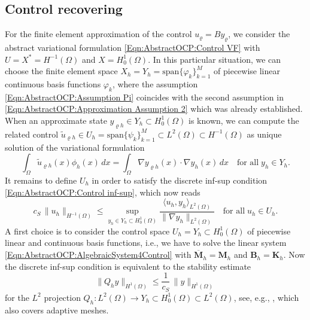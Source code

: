 \documentclass{article}
\numberwithin{equation}{section}
\begin{document}
\subsection{Control recovering}
%
\label{Subsection:Application:EnergyRegularisation:ControlRecovering}
For the finite element approximation of the control $u_\varrho = B y_\varrho$,
we consider the abstract variational
formulation \eqref{Eqn:AbstractOCP:Control VF} with
$U= X^* =H^{-1}(\Omega)$ and $X = H^1_0(\Omega)$. 
In this particular situation, we can choose the finite element space
$X_h = Y_h = \mbox{span} \{ \varphi_k \}_{k=1}^M$
of piecewise linear continuous basis functions $\varphi_k$,
where the assumption \eqref{Eqn:AbstractOCP:Assumption Pi}
coincides with the second assumption
in \eqref{Eqn:AbstractOCP:Approximation Assumption 2} which was
already established.
When an approximate state $y_{\varrho h} \in Y_h \subset H^1_0(\Omega)$
is known, we can compute the related control
$\widetilde{u}_{\varrho h} \in U_h
= \mbox{span} \{ \psi_k \}_{k=1}^M \subset L^2(\Omega) \subset H^{-1}(\Omega)$
as unique solution of the variational formulation
\begin{equation}\label{Eqn:Application:Control Reconstruction}
  \int_\Omega \widetilde{u}_{\varrho h}(x) \phi_h(x) \, dx =
  \int_\Omega \nabla y_{\varrho h}(x) \cdot \nabla y_h(x) \, dx \quad
  \mbox{for all} \; y_h \in Y_h .
\end{equation}
It remains to define $U_h$ in order to satisfy the discrete inf-sup
condition \eqref{Eqn:AbstractOCP:Control inf-sup}, which now reads
\[
  c_S \, \| u_h \|_{H^{-1}(\Omega)}
  \leq \sup\limits_{y_h \in Y_h \subset H^1_0(\Omega)}
  \frac{\langle u_h , y_h \rangle_{L^2(\Omega)}}{\| \nabla y_h
    \|_{L^2(\Omega)}}
  \quad \mbox{for all} \; u_h \in U_h .
\]
A first choice is to consider the control space
$U_h = Y_h \subset H^1_0(\Omega)$ of piecewise linear and continuous basis
functions, i.e., we have to solve the linear system
\eqref{Eqn:AbstractOCP:AlgebraicSystem4Control} with
$\overline{\mathbf M}_h = \mathbf{M}_h$ and ${\mathbf B}_h = \mathbf{K}_h$.
Now the discrete inf-sup condition is equivalent to the stability estimate
\[
\| Q_h y \|_{H^1(\Omega)} \leq \frac{1}{c_S} \,
\| y \|_{H^1(\Omega)}
\]
for the $L^2$ projection
$Q_h : L^2(\Omega) \to Y_h \subset H^1_0(\Omega) \subset L^2(\Omega)$,
see, e.g., \cite{BramblePasciakSteinbach:2002}, which also covers
adaptive meshes.
\end{document}
